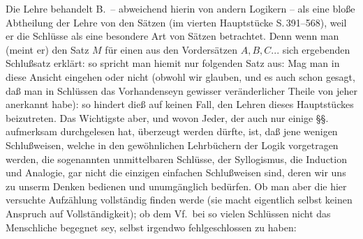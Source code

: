 Die Lehre  behandelt B.\ -- abweichend hierin von andern Logikern -- als eine bloße Abtheilung der Lehre von den Sätzen (im vierten Hauptstücke S.\,391--568), weil er die Schlüsse als eine besondere Art von Sätzen betrachtet. Denn wenn man (meint er) den Satz $M$ für einen aus den Vordersätzen $A, B, C ...$ sich ergebenden Schlußsatz erklärt: so spricht man hiemit nur folgenden Satz aus:  Mag man in diese Ansicht eingehen oder nicht (obwohl wir glauben, und es auch schon gesagt, daß man in Schlüssen das Vorhandenseyn gewisser veränderlicher Theile von jeher anerkannt habe): so hindert dieß auf keinen Fall, den Lehren dieses Hauptstückes beizutreten. Das Wichtigste aber, und wovon Jeder, der auch nur einige §§. aufmerksam durchgelesen hat, überzeugt werden dürfte, ist, daß jene wenigen Schlußweisen, welche in den gewöhnlichen Lehrbüchern der Logik vorgetragen werden, die sogenannten unmittelbaren Schlüsse, der Syllogismus, die Induction und Analogie, gar nicht die einzigen einfachen Schlußweisen sind, deren wir uns zu unserm Denken bedienen und unumgänglich bedürfen. Ob man aber die hier versuchte Aufzählung vollständig finden werde (sie macht eigentlich selbst keinen Anspruch auf Vollständigkeit); ob dem Vf.\ bei so vielen Schlüssen nicht das Menschliche begegnet sey, selbst irgendwo fehlgeschlossen zu haben: 
